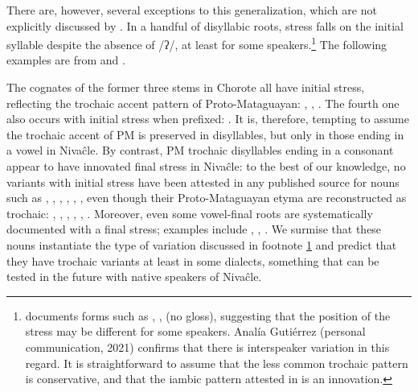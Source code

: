 There are, however, several exceptions to this generalization, which are not explicitly discussed by \citet{AnG15}. In a handful of disyllabic roots, stress falls on the initial syllable despite the absence of /ʔ/, at least for some speakers.\footnote{\label{ni-stress-shift}\citet[150, 189, 205]{NS87} documents forms such as , ,  (no gloss), suggesting that the position of the stress may be different for some speakers. Analía Gutiérrez (personal communication, 2021) confirms that there is interspeaker variation in this regard. It is straightforward to assume that the less common trochaic pattern is conservative, and that the iambic pattern attested in \citet{NS87} is an innovation.} The following examples are from \citet[38, 267]{AnG15} and \citet[36]{LC20}.

\ea\label{ex:stress:trochaic:niv}
    \begin{xlist}
        \ex {}
        \ex {}
        \ex {}
        \ex {}
    \end{xlist}
\z
{}

The cognates of the former three stems in Chorote all have initial stress, reflecting the trochaic accent pattern of Proto-Mataguayan: , , . The fourth one also occurs with initial stress when prefixed: . It is, therefore, tempting to assume the trochaic accent of PM is preserved in disyllables, but only in those ending in a vowel in Nivaĉle. By contrast, PM trochaic disyllables ending in a consonant appear to have innovated final stress in Nivaĉle: to the best of our knowledge, no variants with initial stress have been attested in any published source for nouns such as , , , , ,  \citep[40, 163, 271, 273, 304, 319]{AnG15}, even though their Proto-Mataguayan etyma are reconstructed as trochaic: , , , , , . Moreover, even some vowel-final roots are systematically documented with a final stress; examples include , ,  \citep[38, 68, 110]{AnG15}. We surmise that these nouns instantiate the type of variation discussed in footnote \ref{ni-stress-shift} and predict that they have trochaic variants at least in some dialects, something that can be tested in the future with native speakers of Nivaĉle.

